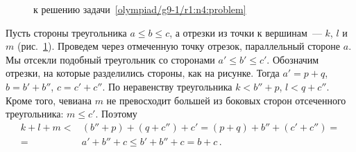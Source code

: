 \ifincludesolutions
\begin{figure}[ht]\begin{center}
    \caption{к решению задачи~\ref{olympiad/g9-1/r1:n4:problem}}%
    \label{olympiad/g9-1/r1:n4:solution:fig}
\end{center}\end{figure}
Пусть стороны треугольника $a \leq b \leq c$, а отрезки из точки к вершинам~---
$k$, $l$ и $m$ (рис.~\ref{olympiad/g9-1/r1:n4:solution:fig}).
Проведем через отмеченную точку отрезок, параллельный стороне $a$.
Мы отсекли подобный треугольник со сторонами $a' \leq b' \leq c'$.
Обозначим отрезки, на которые разделились стороны, как на рисунке.
Тогда $a' = p + q$, $b = b' + b''$, $c = c' + c''$.
По неравенству треугольника $k < b'' + p$, $l < q + c''$.
Кроме того, чевиана $m$ не превосходит большей из боковых сторон отсеченного
треугольника: $m \leq c'$.
Поэтому
\begin{align*}
    k + l + m
<{}&
    (b'' + p) + (q + c'') + c'
=
    (p + q) + b'' + (c' + c'')
=\\={}&
    a' + b'' + c
\leq
    b' + b'' + c
=
    b + c
\,.\end{align*}
\fi %

\endgroup %

